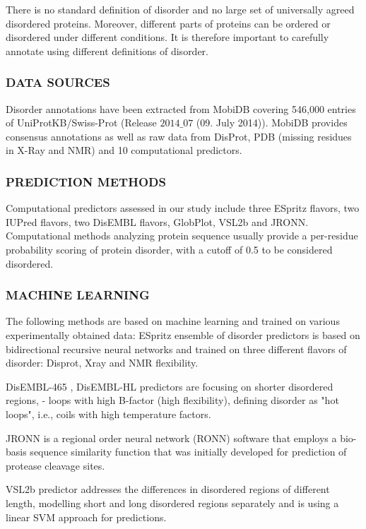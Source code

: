 \documentclass[a4,center,fleqn]{NAR}
\begin{document}
There is no standard definition of disorder and no large set of universally agreed disordered proteins. Moreover, different parts of proteins can be ordered or disordered under different conditions. It is therefore important to carefully annotate using different definitions of disorder.

\subsubsection{\MakeUppercase{Data sources}}
Disorder annotations have been extracted from MobiDB covering 546,000 entries of UniProtKB/Swiss-Prot (Release $2014\_07$ (09. July 2014)).
MobiDB provides consensus annotations as well as raw data from DisProt, PDB (missing residues in X-Ray and NMR) and 10 computational predictors.

\subsubsection{\MakeUppercase{Prediction methods}}
Computational predictors assessed in our study include three ESpritz flavors, two IUPred flavors, two DisEMBL flavors, GlobPlot, VSL2b and JRONN. Computational methods analyzing protein sequence usually provide a per-residue probability scoring of protein disorder, with a cutoff of 0.5 to be considered disordered.

\subsubsection{\MakeUppercase{Machine learning}}
The following methods are based on machine learning and trained on various experimentally obtained data:
ESpritz ensemble of disorder predictors is based on bidirectional recursive neural networks and trained on three different flavors of disorder: Disprot, Xray and NMR flexibility.

DisEMBL-465 , DisEMBL-HL predictors are focusing on shorter disordered regions, - loops with high B-factor (high flexibility), defining disorder as "hot loops", i.e., coils with high temperature factors.

JRONN is a regional order neural network (RONN) software that employs a bio-basis sequence similarity function that was initially developed for prediction of protease cleavage sites.

VSL2b predictor addresses the differences in disordered regions of different length, modelling short and long disordered regions separately and is using a linear SVM approach for predictions.
\end{document}
